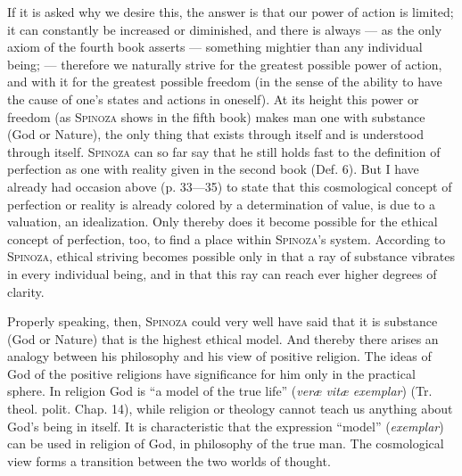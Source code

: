 \documentclass[12pt]{article}
\newcommand{\opage}[1]{\marginnote{\footnotesize\textit{[#1]}}}
\begin{document}
If it is asked why we desire this, the answer is that our power of action is limited; it can
constantly be increased or diminished, and there is always --- as the only axiom of the fourth book
asserts --- something mightier than any individual being; --- therefore we naturally strive for the
greatest possible power of action, and with it for the greatest possible freedom (in the sense of
the ability to have the cause of one's states and actions in oneself). At its height this power or
freedom (as \textsc{Spinoza} shows in the fifth book) makes man one with substance (God or Nature),
the only thing that exists through itself and is understood through itself. \textsc{Spinoza} can so
far say that he still holds fast to the definition of perfection as one with reality given in the
second book (Def. 6). \opage{71}But I have already had occasion above (p. 33---35) to state that
this cosmological concept of perfection or reality is already colored by a determination of
value, is due to a valuation, an idealization. Only thereby does it become possible for the ethical
concept of perfection, too, to find a place within \textsc{Spinoza}'s system. According to
\textsc{Spinoza}, ethical striving becomes possible only in that a ray of substance vibrates in
every individual being, and in that this ray can reach ever higher degrees of clarity.

Properly speaking, then, \textsc{Spinoza} could very well have said that it is substance (God or
Nature) that is the highest ethical model. And thereby there arises an analogy between his
philosophy and his view of positive religion. The ideas of God of the positive religions have
significance for him only in the practical sphere. In religion God is ``a model of the true life''
(\textit{veræ vitæ exemplar}) (Tr. theol. polit. Chap. 14), while religion or theology cannot
teach us anything about God's being in itself. It is characteristic that the expression ``model''
(\textit{exemplar}) can be used in religion of God, in philosophy of the true man. The cosmological
view forms a transition between the two worlds of thought.
\end{document}
